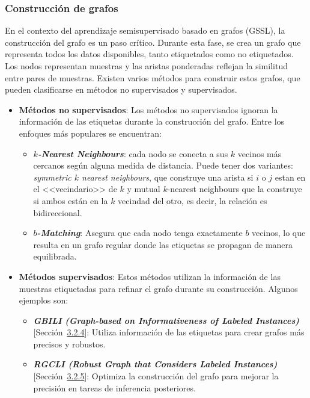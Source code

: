 \subsubsection{Construcción de grafos}
En el contexto del aprendizaje semisupervisado basado en grafos (GSSL), la construcción del grafo es un paso crítico. Durante esta fase, se crea un grafo que representa todos los datos disponibles, tanto etiquetados como no etiquetados. Los nodos representan muestras y las aristas ponderadas reflejan la similitud entre pares de muestras. Existen varios métodos para construir estos grafos, que pueden clasificarse en métodos no supervisados y supervisados.
\begin{itemize}
	\item \textbf{Métodos no supervisados}: Los métodos no supervisados ignoran la información de las etiquetas durante la construcción del grafo. Entre los enfoques más populares se encuentran:
	\begin{itemize}
		\item \textbf{\textit{$k$-Nearest Neighbours}}: cada nodo se conecta a sus $k$ vecinos más cercanos según alguna medida de distancia. Puede tener dos variantes: \textit{symmetric $k$ nearest neighbours}, que construye una arista si $i$ o $j$ estan en el <<vecindario>> de $k$ y mutual $k$-nearest neighbours que la construye si ambos están en la $k$ vecindad del otro, es decir, la relación es bidireccional.
		\item \textbf{\textit{$b$-Matching}}: Asegura que cada nodo tenga exactamente $b$ vecinos, lo que resulta en un grafo regular donde las etiquetas se propagan de manera equilibrada.
	\end{itemize}
	\item \textbf{Métodos supervisados}: Estos métodos utilizan la información de las muestras etiquetadas para refinar el grafo durante su construcción. Algunos ejemplos son:
	\begin{itemize}
		\item \textbf{\textit{GBILI (Graph-based on Informativeness of Labeled Instances)}} [Sección~\hyperref[sec3:gbili]{3.2.4}]: Utiliza información de las etiquetas para crear grafos más precisos y robustos.
		\item \textbf{\textit{RGCLI (Robust Graph that Considers Labeled Instances)}} [Sección~\hyperref[sec3:rgcli]{3.2.5}]: Optimiza la construcción del grafo para mejorar la precisión en tareas de inferencia posteriores.
	\end{itemize}
\end{itemize}


